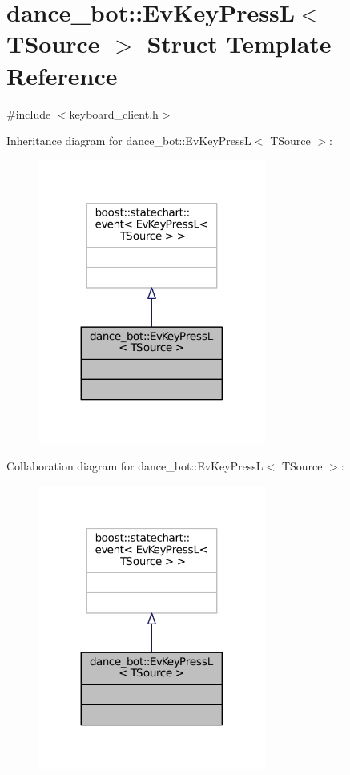 \hypertarget{structdance__bot_1_1EvKeyPressL}{}\section{dance\+\_\+bot\+:\+:Ev\+Key\+PressL$<$ T\+Source $>$ Struct Template Reference}
\label{structdance__bot_1_1EvKeyPressL}


{\ttfamily \#include $<$keyboard\+\_\+client.\+h$>$}



Inheritance diagram for dance\+\_\+bot\+:\+:Ev\+Key\+PressL$<$ T\+Source $>$\+:
\nopagebreak
\begin{figure}[H]
\begin{center}
\leavevmode
\includegraphics[width=212pt]{structdance__bot_1_1EvKeyPressL__inherit__graph}
\end{center}
\end{figure}


Collaboration diagram for dance\+\_\+bot\+:\+:Ev\+Key\+PressL$<$ T\+Source $>$\+:
\nopagebreak
\begin{figure}[H]
\begin{center}
\leavevmode
\includegraphics[width=212pt]{structdance__bot_1_1EvKeyPressL__coll__graph}
\end{center}
\end{figure}


